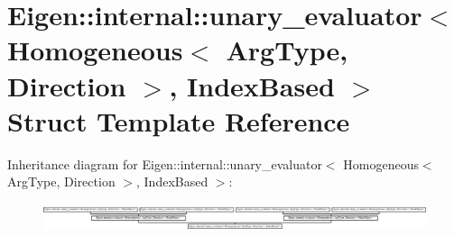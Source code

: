 \hypertarget{struct_eigen_1_1internal_1_1unary__evaluator_3_01_homogeneous_3_01_arg_type_00_01_direction_01_4_00_01_index_based_01_4}{}\section{Eigen\+:\+:internal\+:\+:unary\+\_\+evaluator$<$ Homogeneous$<$ Arg\+Type, Direction $>$, Index\+Based $>$ Struct Template Reference}
\label{struct_eigen_1_1internal_1_1unary__evaluator_3_01_homogeneous_3_01_arg_type_00_01_direction_01_4_00_01_index_based_01_4}
Inheritance diagram for Eigen\+:\+:internal\+:\+:unary\+\_\+evaluator$<$ Homogeneous$<$ Arg\+Type, Direction $>$, Index\+Based $>$\+:\begin{figure}[H]
\begin{center}
\leavevmode
\includegraphics[height=0.823529cm]{struct_eigen_1_1internal_1_1unary__evaluator_3_01_homogeneous_3_01_arg_type_00_01_direction_01_4_00_01_index_based_01_4}
\end{center}
\end{figure}
